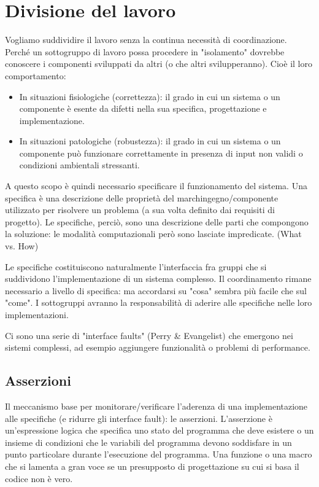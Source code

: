 \documentclass[a4paper,12pt,titlepage,oneside]{book}
\begin{document}
\chapter{Divisione del lavoro}
Vogliamo suddividire il lavoro senza la continua necessità di coordinazione. Perché un sottogruppo di lavoro possa procedere in "isolamento" dovrebbe conoscere i componenti 
sviluppati da altri (o che altri svilupperanno). Cioè il loro comportamento:
\begin{itemize}
    \item In situazioni fisiologiche (correttezza): il grado in cui un sistema o un componente è esente da difetti nella sua specifica, progettazione e implementazione.
    \item In situazioni patologiche (robustezza): il grado in cui un sistema o un componente può funzionare correttamente in presenza di input non validi o condizioni ambientali stressanti.
\end{itemize}
    A questo scopo è quindi necessario specificare il funzionamento del sistema.
    Una specifica è una descrizione delle proprietà del marchingegno/componente utilizzato per risolvere un problema (a sua volta definito dai requisiti di progetto). Le specifiche, perciò, sono una descrizione delle parti 
    che compongono la soluzione: le modalità computazionali però sono lasciate impredicate. (What vs. How)

    Le specifiche costituiscono naturalmente l'interfaccia fra gruppi che si suddividono l'implementazione di un sistema complesso.
    Il coordinamento rimane necessario a livello di specifica: ma accordarsi su "cosa" sembra più facile che sul "come".
    I sottogruppi avranno la responsabilità di aderire alle specifiche nelle loro implementazioni.

    Ci sono una serie di "interface faults" (Perry \& Evangelist) che emergono nei sistemi complessi, ad esempio aggiungere funzionalità o problemi di performance.

\section{Asserzioni}
    Il meccanismo base per monitorare/verificare l'aderenza di una implementazione alle specifiche (e ridurre gli interface fault): le asserzioni.
    L'asserzione è un'espressione logica che specifica uno stato del programma che deve esistere o un insieme di condizioni che le variabili del programma devono soddisfare in un punto particolare durante l'esecuzione del 
    programma. Una funzione o una macro che si lamenta a gran voce se un presupposto di progettazione su cui si basa il codice non è vero.
\end{document}
